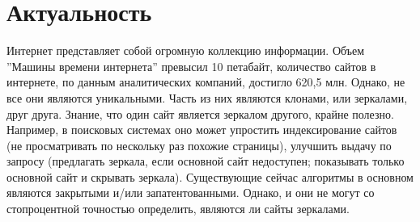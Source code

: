 \section{Актуальность}
Интернет представляет собой огромную коллекцию информации. Объем ''Машины времени интернета'' превысил 10 петабайт, количество сайтов в интернете, по данным аналитических компаний, достигло 620,5 млн. %
Однако, не все они являются уникальными. Часть из них являются клонами, или зеркалами, друг друга. Знание, что один сайт является зеркалом другого, крайне полезно. Например, в поисковых системах оно может упростить индексирование сайтов (не просматривать по нескольку раз похожие страницы), улучшить выдачу по запросу (предлагать зеркала, если основной сайт недоступен; показывать только основной сайт и скрывать зеркала). %
Существующие сейчас алгоритмы в основном являются закрытыми и/или запатентованными. Однако, и они не могут со стопроцентной точностью определить, являются ли сайты зеркалами.